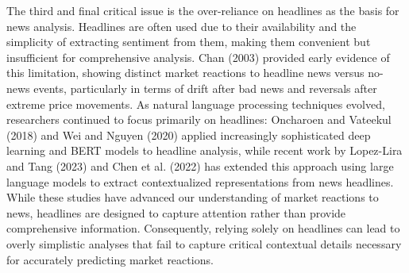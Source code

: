\mx 
The third and final critical issue is the over-reliance on headlines as the basis for news analysis.
Headlines are often used due to their availability and the simplicity of extracting sentiment from them, making them convenient but insufficient for comprehensive analysis. 
\cite{chan2003stock}  Chan (2003) 
provided early evidence of this limitation, showing distinct market reactions to headline news versus no-news events, particularly in terms of drift after bad news and reversals after extreme price movements. As natural language processing techniques evolved, researchers continued to focus primarily on headlines: 
\cite{oncharoen2018deep}  Oncharoen and Vateekul (2018) 
and 
\cite{wei2018stock}  Wei and Nguyen (2020) 
applied increasingly sophisticated deep learning and BERT models to headline analysis, while recent work by 
\cite{lopez2023can}  Lopez-Lira and Tang (2023) 
and 
\cite{chen2022expected}  Chen et al. (2022) 
has extended this approach using large language models to extract contextualized representations from news headlines.
While these studies have advanced our understanding of market reactions to news, headlines are designed to capture attention rather than provide comprehensive information. Consequently, relying solely on headlines can lead to overly simplistic analyses that fail to capture critical contextual details necessary for accurately predicting market reactions.


